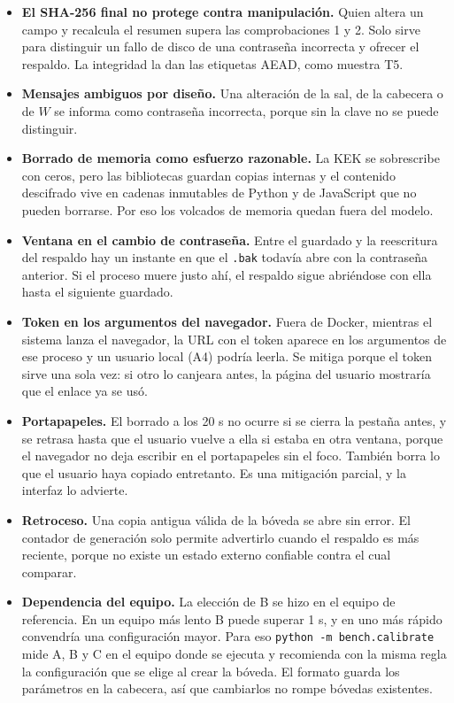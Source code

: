 \documentclass[11pt,letterpaper]{article}
\newcommand{\code}[1]{\texttt{#1}}
\begin{document}
\begin{itemize}
\item \textbf{El SHA-256 final no protege contra manipulación.} Quien altera un campo y recalcula el resumen supera las comprobaciones 1 y 2. Solo sirve para distinguir un fallo de disco de una contraseña incorrecta y ofrecer el respaldo. La integridad la dan las etiquetas AEAD, como muestra T5.
\item \textbf{Mensajes ambiguos por diseño.} Una alteración de la sal, de la cabecera o de $W$ se informa como contraseña incorrecta, porque sin la clave no se puede distinguir.
\item \textbf{Borrado de memoria como esfuerzo razonable.} La KEK se sobrescribe con ceros, pero las bibliotecas guardan copias internas y el contenido descifrado vive en cadenas inmutables de Python y de JavaScript que no pueden borrarse. Por eso los volcados de memoria quedan fuera del modelo.
\item \textbf{Ventana en el cambio de contraseña.} Entre el guardado y la reescritura del respaldo hay un instante en que el \code{.bak} todavía abre con la contraseña anterior. Si el proceso muere justo ahí, el respaldo sigue abriéndose con ella hasta el siguiente guardado.
\item \textbf{Token en los argumentos del navegador.} Fuera de Docker, mientras el sistema lanza el navegador, la URL con el token aparece en los argumentos de ese proceso y un usuario local (A4) podría leerla. Se mitiga porque el token sirve una sola vez: si otro lo canjeara antes, la página del usuario mostraría que el enlace ya se usó.
\item \textbf{Portapapeles.} El borrado a los 20 s no ocurre si se cierra la pestaña antes, y se retrasa hasta que el usuario vuelve a ella si estaba en otra ventana, porque el navegador no deja escribir en el portapapeles sin el foco. También borra lo que el usuario haya copiado entretanto. Es una mitigación parcial, y la interfaz lo advierte.
\item \textbf{Retroceso.} Una copia antigua válida de la bóveda se abre sin error. El contador de generación solo permite advertirlo cuando el respaldo es más reciente, porque no existe un estado externo confiable contra el cual comparar.
\item \textbf{Dependencia del equipo.} La elección de B se hizo en el equipo de referencia. En un equipo más lento B puede superar 1 s, y en uno más rápido convendría una configuración mayor. Para eso \code{python -m bench.calibrate} mide A, B y C en el equipo donde se ejecuta y recomienda con la misma regla la configuración que se elige al crear la bóveda. El formato guarda los parámetros en la cabecera, así que cambiarlos no rompe bóvedas existentes.

\end{itemize}
\end{document}
